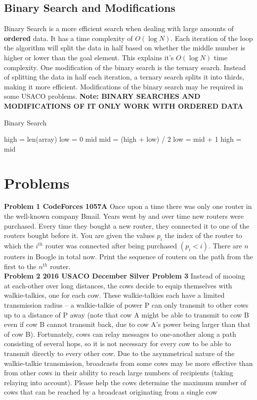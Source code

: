 \documentclass[11pt]{article}
\begin{document}
    \subsection{Binary Search and Modifications}
         Binary Search is a more efficient search when dealing with large amounts of \textbf{ordered} data. It has a time complexity of $O(\log N)$. Each iteration of the loop the algorithm will split the data in half based on whether the middle number is higher or lower than the goal element. This explains it's $O(\log N)$ time complexity. One modification of the binary search is the ternary search. Instead of splitting the data in half each iteration, a ternary search splits it into thirds, making it more efficient. Modifications of the binary search may be required in some USACO problems. \textbf{Note: BINARY SEARCHES AND MODIFICATIONS OF IT ONLY WORK WITH ORDERED DATA}
        \begin{algorithm}
        \caption{Binary Search}\label{alg:prop}
        \begin{algorithmic}[1]
        \State high = len(array)
        \State low = 0
        \State mid
            \State mid = (high + low) / 2
                \State low = mid + 1
            \Else
                \State high = mid
        \EndWhile
        \end{algorithmic}
        \end{algorithm} 
\newpage
\section{Problems}
\textbf{Problem 1 CodeForces 1057A} Once upon a time there was only one router in the well-known company Bmail. Years went by and over time new routers were purchased. Every time they bought a new router, they connected it to one of the routers bought before it. You are given the values $p_i$ the index of the router to which the $i^{th}$ router was connected after being purchased $(p_i < i)$. There are $n$ routers in Boogle in total now. Print the sequence of routers on the path from the first to the $n^{th}$ router.\\

\textbf{Problem 2 2016 USACO December Silver Problem 3} Instead of mooing at each-other over long distances, the cows decide to equip themselves with walkie-talkies, one for each cow. These walkie-talkies each have a limited transmission radius -- a walkie-talkie of power P can only transmit to other cows up to a distance of P away (note that cow A might be able to transmit to cow B even if cow B cannot transmit back, due to cow A's power being larger than that of cow B). Fortunately, cows can relay messages to one-another along a path consisting of several hops, so it is not necessary for every cow to be able to transmit directly to every other cow. Due to the asymmetrical nature of the walkie-talkie transmission, broadcasts from some cows may be more effective than from other cows in their ability to reach large numbers of recipients (taking relaying into account). Please help the cows determine the maximum number of cows that can be reached by a broadcast originating from a single cow \\
\end{document}
